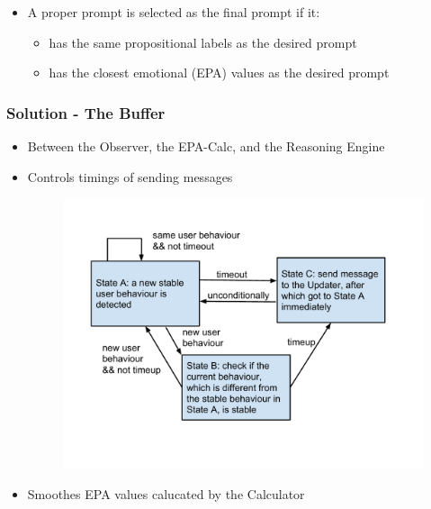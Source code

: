 \documentclass{beamer}
\begin{document}
\begin{frame}
\begin{itemize}
\begin{figure}[htb]
\begin{subfigure}[b]{.4\textwidth}
\end{subfigure}
\end{figure}
\item A proper prompt is selected as the final prompt if it:
\begin{itemize}
\item has the same propositional labels as the desired prompt
\item has the closest emotional (EPA) values as the desired prompt
\end{itemize}
\end{itemize}
\end{frame}

\begin{frame}
\frametitle{Solution - The Buffer}
\begin{itemize}
\item Between the Observer, the EPA-Calc, and the Reasoning Engine
\item Controls timings of sending messages
\begin{figure}
\centering
\includegraphics[trim = 10mm 25mm 16mm 15mm, clip, width=0.75\linewidth]{fig/fig-state-trans.pdf}
\end{figure}
\item Smoothes EPA values calucated by the Calculator
\end{itemize}
\end{frame}

\end{document}
